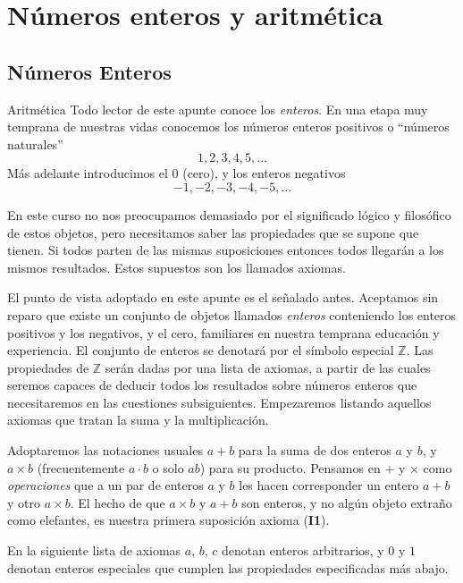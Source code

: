 \part{Números enteros y aritmética} 

\chapter[Números Enteros]{Números Enteros}\label{cap.numeros_enteros}

\begin{section}{Aritmética}\label{1.1}
 Todo lector de este apunte conoce los \textit{enteros}. En una etapa muy temprana de nuestras vidas conocemos los números enteros positivos o ``números naturales'' $$1,2,3,4,5,\ldots$$ Más adelante introducimos el $0$ (cero), y los enteros negativos $$ -1,-2,-3,-4,-5,\ldots $$ 

En este curso no nos preocupamos demasiado por el significado lógico y filosófico de estos objetos, pero necesitamos saber las propiedades que se supone que tienen. Si todos parten de las mismas suposiciones entonces todos llegarán a los mismos resultados. Estos supuestos son los llamados axio\-mas.

El punto de vista adoptado en este apunte es el señalado antes. Aceptamos sin reparo que existe un conjunto de objetos llamados \textit{enteros} conteniendo los enteros positivos y los negativos, y el cero, familiares en nuestra temprana educación y experiencia. El conjunto de enteros se denotará por el símbolo especial ${\mathbb Z}$. Las propiedades de ${\mathbb Z}$ serán dadas por una lista de axiomas, a partir de las cuales seremos capaces de deducir todos los resultados sobre números enteros que necesitaremos en las cuestiones subsiguientes. Empezaremos listando aquellos axiomas que tratan la suma y la multiplicación.

Adoptaremos las notaciones usuales $a+b$ para la suma de dos enteros $a$ y $b$, y $a \times b$ (frecuentemente $a \cdot b$ o solo $ab$) para su producto. Pensamos en $+$ y $\times$ como \textit{operaciones} que a un par de enteros $a$ y $b$ les hacen corresponder un entero $a+b$ y otro $a\times b$. El hecho de que $a \times b$ y $a+b$ son enteros, y no algún objeto extra\~no como elefantes, es nuestra primera suposición axioma (\textbf{I1}).     

En la siguiente lista de axiomas $a$, $b$, $c$ denotan enteros arbitrarios, y $0$ y $1$ denotan enteros especiales que cumplen las propiedades especificadas más abajo.


\end{section}
